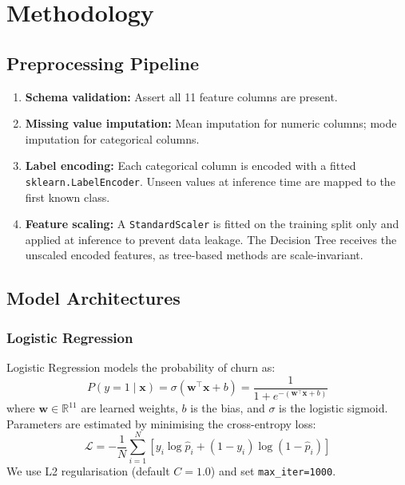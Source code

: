 \documentclass[conference]{IEEEtran}
\begin{document}
\section{Methodology}

\subsection{Preprocessing Pipeline}

\begin{enumerate}
  \item \textbf{Schema validation:} Assert all 11 feature columns are present.
  \item \textbf{Missing value imputation:} Mean imputation for numeric columns;
        mode imputation for categorical columns.
  \item \textbf{Label encoding:} Each categorical column is encoded with a
        fitted \texttt{sklearn.LabelEncoder}.  Unseen values at inference time
        are mapped to the first known class.
  \item \textbf{Feature scaling:} A \texttt{StandardScaler} is fitted on the
        training split only and applied at inference to prevent data leakage.
        The Decision Tree receives the unscaled encoded features, as tree-based
        methods are scale-invariant.
\end{enumerate}

\subsection{Model Architectures}

\subsubsection{Logistic Regression}

Logistic Regression models the probability of churn as:
\begin{equation}
  P(y=1 \mid \mathbf{x}) = \sigma(\mathbf{w}^\top \mathbf{x} + b)
  = \frac{1}{1 + e^{-(\mathbf{w}^\top \mathbf{x} + b)}}
  \label{eq:lr}
\end{equation}
where $\mathbf{w} \in \mathbb{R}^{11}$ are learned weights, $b$ is the bias,
and $\sigma$ is the logistic sigmoid.  Parameters are estimated by minimising
the cross-entropy loss:
\begin{equation}
  \mathcal{L} = -\frac{1}{N} \sum_{i=1}^{N}
    \left[ y_i \log \hat{p}_i + (1-y_i) \log (1-\hat{p}_i) \right]
  \label{eq:logloss}
\end{equation}
We use L2 regularisation (default $C=1.0$) and set \texttt{max\_iter=1000}.
\end{document}
